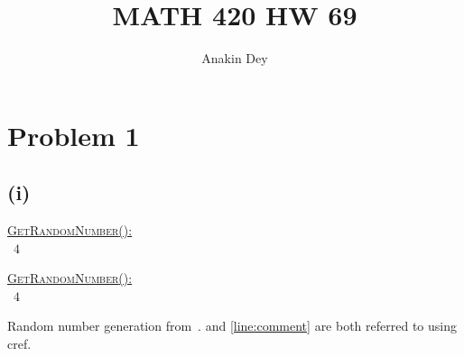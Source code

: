 \documentclass[letterpaper]{article}
\title{MATH 420 HW 69}
\author{Anakin Dey}
\begin{document}
\maketitle

\section*{Problem 1}
\subsection*{(i)}

%

\begin{algo}[1.3]
    \underline{\textsc{GetRandomNumber}():}\+
\\      \return\ $4$   
\\      \hspace{39.00pt}
\end{algo}

\begin{nalgo}
                    \underline{\textsc{GetRandomNumber}():}\+
\\\label{line:ret}      \return\ $4$   
\\\label{line:comment}  \hspace{39.00pt}
\end{nalgo}

Random number generation from~\cite{site:xkcd}.  and \cref{line:comment} are both referred to using cref.

\end{document}
